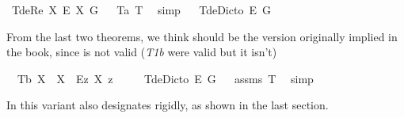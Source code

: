 \begin{isabellebody}
\isamarkupfalse%
\ T{}{\isacharunderscore}deRe{\isacharcolon}\ {\isachardoublequoteopen}{\isasymlfloor}{\isacharparenleft}{\isasymlambda}X{\isachardot}\ \isactrlbold {\isasymdiamond}\isactrlbold {\isasymexists}\isactrlsup E\ X{\isacharparenright}\ \isactrlbold {\isasymdown}G{\isasymrfloor}{\isachardoublequoteclose}%
\isadelimproof
\ %
\endisadelimproof
%
\isatagproof
{}\isamarkupfalse%
\ T{}a\ T{}\ \isamarkupfalse%
\ simp%
\endisatagproof
{\isafoldproof}%
%
\isadelimproof
%
\endisadelimproof
\ \isanewline
{}\isamarkupfalse%
\ T{}{\isacharunderscore}deDicto{\isacharcolon}\ {\isachardoublequoteopen}{\isasymlfloor}\isactrlbold {\isasymdiamond}\isactrlbold {\isasymexists}\isactrlsup E\ \isactrlbold {\isasymdown}G{\isasymrfloor}{\isachardoublequoteclose}\ \isamarkupfalse%
%
\isadelimproof
\ %
\endisadelimproof
%
\isatagproof
{}\isamarkupfalse%
\ \ \ \ %
%
\endisatagproof
{\isafoldproof}%
%
\isadelimproof
%
\endisadelimproof
%
\begin{isamarkuptext}%
From the last two theorems, we think  should be the version originally implied in the book,
 since  is not valid (\emph{T1b} were valid but it isn't)%
\end{isamarkuptext}\isamarkuptrue%
\isamarkupfalse%
\ \ T{}b{\isacharcolon}\ {\isachardoublequoteopen}{\isasymlfloor}\isactrlbold {\isasymforall}X{\isachardot}\ {\isasymP}\ {\isasymdown}X\ \isactrlbold {\isasymrightarrow}\ \isactrlbold {\isasymdiamond}{\isacharparenleft}\isactrlbold {\isasymexists}\isactrlsup Ez{\isachardot}\ X\ z{\isacharparenright}{\isasymrfloor}{\isachardoublequoteclose}\ \isanewline
\ \ \ \ T{}{\isacharunderscore}deDicto{\isacharcolon}\ {\isachardoublequoteopen}{\isasymlfloor}\isactrlbold {\isasymdiamond}\isactrlbold {\isasymexists}\isactrlsup E\ \isactrlbold {\isasymdown}G{\isasymrfloor}{\isachardoublequoteclose}%
\isadelimproof
\ %
\endisadelimproof
%
\isatagproof
{}\isamarkupfalse%
\ assms\ T{}\ \isamarkupfalse%
\ simp%
\endisatagproof
{\isafoldproof}%
%
\isadelimproof
%
\endisadelimproof
%
\isamarkuptrue%
%
\begin{isamarkuptext}%
In this variant \isa{{\isasymP}} also designates rigidly, as shown in the last section.%

\end{isamarkuptext}
\end{isabellebody}
